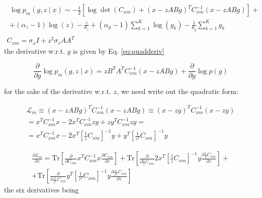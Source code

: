 \documentclass{paper}
\begin{document}
\begin{eqnarray}
\begin{split}
\log p_m(g,z \mid x) \sim -\frac{1}{2} \left[ \log \det (C_{xm}) + (x-zABg)^T C_{xm}^{-1} (x-zABg) \right] + \\
+ (\alpha_z-1)\log(z) - \frac{z}{\theta_z} + (\alpha_g-1)\sum_{k=1}^K \log(g_k) - \frac{1}{\theta_g} \sum_{k=1}^K g_k
\end{split} \\
C_{xm} = \sigma_x I + z^2 \sigma_v AA^T
\end{eqnarray}
%
the derivative w.r.t. $g$ is given by Eq. \ref{eq:quadderiv}

\begin{equation}
\frac{\partial}{\partial g} \log p_m(g,z \mid x) = zB^TA^T C_{xm}^{-1} (x-zABg) + \frac{\partial}{\partial g} \log p(g)
\end{equation}

%
for the sake of the derivative w.r.t. $z$, we need write out the quadratic form:

\begin{equation}
\begin{split}
\mathcal{L}_m \equiv (x-zABg)^T C_{xm}^{-1} (x-zABg) \equiv (x-zy)^T C_{xm}^{-1} (x-zy) \\
= x^T C_{xm}^{-1} x - 2 x^T C_{xm}^{-1} zy + zy^T C_{xm}^{-1} zy = \\
= x^T C_{xm}^{-1} x - 2 x^T \left[ \frac{1}{z} C_{xm} \right]^{-1} y + y^T  \left[ \frac{1}{z^2} C_{xm} \right]^{-1} y
\end{split}
\end{equation}

\begin{equation}
\begin{split}
\frac{\partial  \mathcal{L}_m}{\partial z}  = \mathrm{Tr} \left[  \frac{\partial}{\partial C_{xm}} x^T C_{xm}^{-1} x  \frac{\partial C_{xm}}{\partial z} \right] 
+ \mathrm{Tr} \left[  \frac{\partial}{\partial \frac{1}{z} C_{xm}}  2 x^T \left[ \frac{1}{z} C_{xm} \right]^{-1} y  \frac{\partial \frac{1}{z} C_{xm}}{\partial z} \right] + \\ 
+  \mathrm{Tr} \left[  \frac{\partial}{\partial \frac{1}{z^2} C_{xm}}   y^T  \left[ \frac{1}{z^2} C_{xm} \right]^{-1} y  \frac{\partial \frac{1}{z^2} C_{xm}}{\partial z} \right]
\end{split}
\end{equation}
%
the six derivatives being
\end{document}
